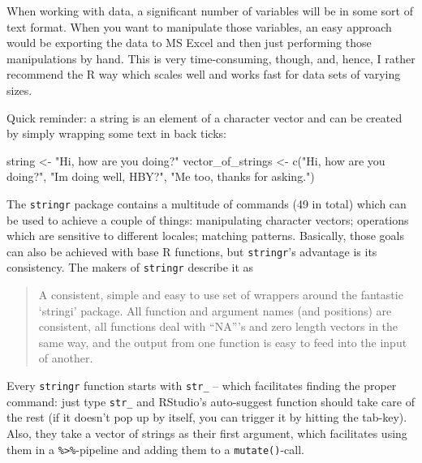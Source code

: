 \documentclass[
]{book}
\newenvironment{Shaded}{\begin{snugshade}}{\end{snugshade}}
\newcommand{\FunctionTok}[1]{\textcolor[rgb]{0.00,0.00,0.00}{#1}}
\newcommand{\NormalTok}[1]{#1}
\newcommand{\OtherTok}[1]{\textcolor[rgb]{0.56,0.35,0.01}{#1}}
\newcommand{\StringTok}[1]{\textcolor[rgb]{0.31,0.60,0.02}{#1}}
\begin{document}
When working with data, a significant number of variables will be in some sort of text format. When you want to manipulate those variables, an easy approach would be exporting the data to MS Excel and then just performing those manipulations by hand. This is very time-consuming, though, and, hence, I rather recommend the R way which scales well and works fast for data sets of varying sizes.

Quick reminder: a string is an element of a character vector and can be created by simply wrapping some text in back ticks:

\begin{Shaded}
\begin{Highlighting}[]
\NormalTok{string }\OtherTok{\textless{}{-}} \StringTok{"Hi, how are you doing?"}
\NormalTok{vector\_of\_strings }\OtherTok{\textless{}{-}} \FunctionTok{c}\NormalTok{(}\StringTok{"Hi, how are you doing?"}\NormalTok{, }\StringTok{"I\textquotesingle{}m doing well, HBY?"}\NormalTok{, }\StringTok{"Me too, thanks for asking."}\NormalTok{)}
\end{Highlighting}
\end{Shaded}

The \texttt{stringr} package \citep{wickham2019b} contains a multitude of commands (49 in total) which can be used to achieve a couple of things: manipulating character vectors; operations which are sensitive to different locales; matching patterns. Basically, those goals can also be achieved with base R functions, but \texttt{stringr}'s advantage is its consistency. The makers of \texttt{stringr} describe it as

\begin{quote}
A consistent, simple and easy to use set of wrappers around the fantastic `stringi' package. All function and argument names (and positions) are consistent, all functions deal with ``NA'''s and zero length vectors in the same way, and the output from one function is easy to feed into the input of another.
\end{quote}

Every \texttt{stringr} function starts with \texttt{str\_} -- which facilitates finding the proper command: just type \texttt{str\_} and RStudio's auto-suggest function should take care of the rest (if it doesn't pop up by itself, you can trigger it by hitting the tab-key). Also, they take a vector of strings as their first argument, which facilitates using them in a \texttt{\%\textgreater{}\%}-pipeline and adding them to a \texttt{mutate()}-call.
\end{document}
